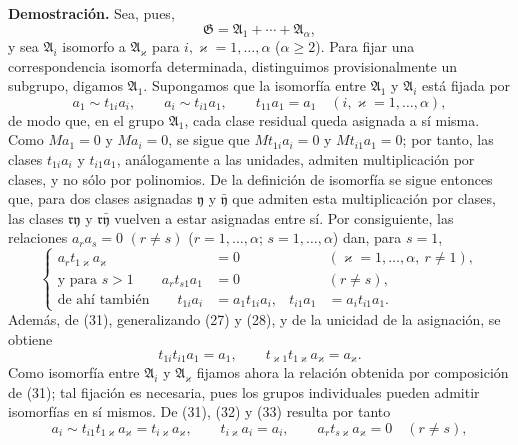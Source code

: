 \documentclass[11pt]{article}
\begin{document}
\textbf{Demostración.} Sea, pues,
\[
  \mathfrak G=\mathfrak A_1+\cdots+\mathfrak A_\alpha,
\]
y sea $\mathfrak A_i$ isomorfo a $\mathfrak A_\varkappa$ para $i,\varkappa=1,\ldots,\alpha$ ($\alpha\ge2$). Para fijar una correspondencia isomorfa determinada, distinguimos provisionalmente un subgrupo, digamos $\mathfrak A_1$. Supongamos que la isomorfía entre $\mathfrak A_1$ y $\mathfrak A_i$ está fijada por
\begin{equation}
 a_1\sim t_{1i}a_i,
 \qquad
 a_i\sim t_{i1}a_1,
 \qquad
 t_{11}a_1=a_1
 \quad(i,\varkappa=1,
\ldots,\alpha),
\tag{31}
\end{equation}
de modo que, en el grupo $\mathfrak A_1$, cada clase residual queda asignada a sí misma. Como $Ma_1=0$ y $Ma_i=0$, se sigue que $Mt_{1i}a_i=0$ y $Mt_{i1}a_1=0$; por tanto, las clases $t_{1i}a_i$ y $t_{i1}a_1$, análogamente a las unidades, admiten multiplicación por clases, y no sólo por polinomios. De la definición de isomorfía se sigue entonces que, para dos clases asignadas $\mathfrak y$ y $\bar{\mathfrak y}$ que admiten esta multiplicación por clases, las clases $\mathfrak r\mathfrak y$ y $\mathfrak r\bar{\mathfrak y}$ vuelven a estar asignadas entre sí. Por consiguiente, las relaciones $a_ra_s=0$ $(r\ne s)$ ($r=1,\ldots,\alpha$; $s=1,\ldots,\alpha$) dan, para $s=1$,
\begin{equation}
\left\{
\begin{aligned}
 a_r t_{1\varkappa}a_\varkappa&=0 &&(\varkappa=1,
\ldots,
\alpha,
\ r\ne1),\\
 \text{y para }s>1\qquad a_r t_{s1}a_1&=0 &&(r\ne s),\\
 \text{de ahí también}\qquad t_{1i}a_i&=a_1t_{1i}a_i,
 &t_{i1}a_1&=a_it_{i1}a_1.
\end{aligned}\right.
\tag{32}
\end{equation}
Además, de (31), generalizando (27) y (28), y de la unicidad de la asignación, se obtiene
\begin{equation}
 t_{1i}t_{i1}a_1=a_1,
 \qquad
 t_{\varkappa1}t_{1\varkappa}a_\varkappa=a_\varkappa.
\tag{33}
\end{equation}
Como isomorfía entre $\mathfrak A_i$ y $\mathfrak A_\varkappa$ fijamos ahora la relación obtenida por composición de (31); tal fijación es necesaria, pues los grupos individuales pueden admitir isomorfías en sí mismos. De (31), (32) y (33) resulta por tanto
\begin{equation}
 a_i\sim t_{i1}t_{1\varkappa}a_\varkappa=t_{i\varkappa}a_\varkappa,
 \qquad
 t_{i\varkappa}a_i=a_i,
 \qquad
 a_rt_{s\varkappa}a_\varkappa=0\quad(r\ne s),
\tag{34}
\end{equation}
\end{document}
